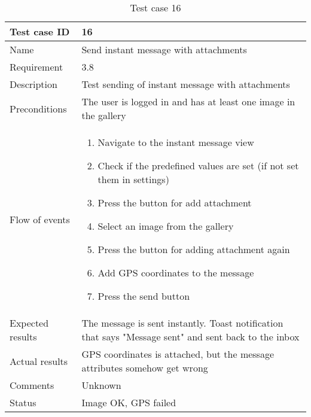 		\begin{table}
			\begin{tabular}{l|p{10cm}}
				Test case ID & 16 \\ \hline
				Name & Send instant message with attachments\\ \hline
				Requirement & 3.8\\ \hline
				Description & Test sending of instant message with attachments\\ \hline
				Preconditions & The user is logged in and has at least one image in the gallery\\ \hline
				Flow of events & 
					\begin{enumerate}
						\item{}Navigate to the instant message view
						\item{}Check if the predefined values are set (if not set them in settings)
						\item{}Press the button for add attachment
						\item{}Select an image from the gallery
						\item{}Press the button for adding attachment again	
						\item{}Add GPS coordinates to the message
						\item{}Press the send button
					\end{enumerate} \\ \hline
				Expected results & The message is sent instantly.  Toast notification that says "Message sent" and sent 							back to the inbox\\ \hline
				Actual results &GPS coordinates is attached, but the message attributes somehow get wrong\\ \hline
				Comments &Unknown\\ \hline
				Status &Image OK, GPS failed\\ \hline
			\end{tabular}
			\caption{Test case 16} \label{tab:case16}
		\end{table}

